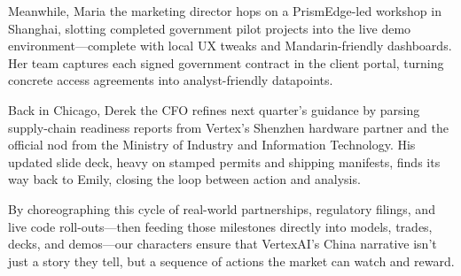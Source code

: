 Meanwhile, Maria the marketing director hops on a PrismEdge-led workshop in Shanghai, slotting completed 
government pilot projects into the live demo environment—complete with local UX tweaks and Mandarin-friendly 
dashboards. Her team captures each signed government contract in the client portal, turning concrete access 
agreements into analyst-friendly datapoints.

Back in Chicago, Derek the CFO refines next quarter’s guidance by parsing supply-chain readiness reports from 
Vertex’s Shenzhen hardware partner and the official nod from the Ministry of Industry and Information Technology. 
His updated slide deck, heavy on stamped permits and shipping manifests, finds its way back to Emily, closing the 
loop between action and analysis.

By choreographing this cycle of real-world partnerships, regulatory filings, and live code roll-outs—then feeding 
those milestones directly into models, trades, decks, and demos—our characters ensure that VertexAI’s China 
narrative isn’t just a story they tell, but a sequence of actions the market can watch and reward.


\medskip

